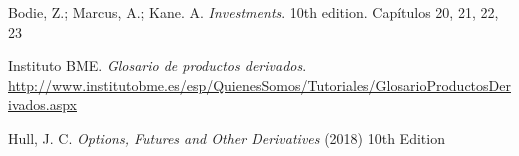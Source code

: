 \documentclass{nuevotema}
\begin{document}
Bodie, Z.; Marcus, A.; Kane. A. \textit{Investments}. 10th edition. Capítulos 20, 21, 22, 23

Instituto BME. \textit{Glosario de productos derivados}. \url{http://www.institutobme.es/esp/QuienesSomos/Tutoriales/GlosarioProductosDerivados.aspx}

Hull, J. C. \textit{Options, Futures and Other Derivatives} (2018) 10th Edition
\end{document}
